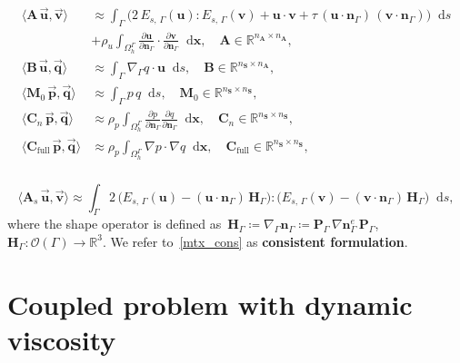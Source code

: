 \documentclass{article}
\newcommand{\vect}[1]{\boldsymbol{\mathbf{#1}}}
\newcommand*\diff{\mathop{}\!\mathrm{d}}
\begin{document}
\begin{align}\begin{split}\label{mtx}
\langle \vect A\,\vec{\vect u}, \vec{\vect v} \rangle &\approx 
\int_{\Gamma} \big( 2\,E_{s,\,\Gamma}(\vect u) : E_{s,\,\Gamma}(\vect v) + \vect u\cdot\vect v + \tau\,(\vect u\cdot\vect n_\Gamma)\,(\vect v\cdot\vect n_\Gamma) \big) \diff{s} \\
&+ 
\rho_u \int_{\Omega_h^{\Gamma}} \frac{\partial \vect u}{\partial\vect n_\Gamma}\cdot\frac{\partial \vect v}{\partial\vect n_\Gamma} \diff{\vect x}, \quad \vect A \in \mathbb R^{n_{\vect A} \times n_{\vect A}},\\
\langle \vect B\,\vec{\vect u}, \vec{\vect q} \rangle &\approx 
\int_{\Gamma} \nabla_\Gamma q \cdot \vect u \diff{s}, \quad \vect B \in \mathbb R^{n_{\vect S} \times n_{\vect A}},\\
\langle \vect M_0\,\vec{\vect p}, \vec{\vect q} \rangle &\approx
\int_{\Gamma} p\,q \diff{s}, \quad \vect M_0 \in \mathbb R^{n_{\vect S} \times n_{\vect S}},\\
\langle \vect C_n\,\vec{\vect p}, \vec{\vect q} \rangle &\approx
\rho_p \int_{\Omega^{\Gamma}_h} \frac{\partial p}{\partial\vect n_\Gamma} \frac{\partial q}{\partial\vect n_\Gamma} \diff{\vect x}, \quad \vect C_n \in \mathbb R^{n_{\vect S} \times n_{\vect S}},\\
\langle \vect C_{\text{full}}\,\vec{\vect p}, \vec{\vect q} \rangle &\approx
\rho_p \int_{\Omega^{\Gamma}_h} \nabla p \cdot \nabla q \diff{\vect x}, \quad \vect C_{\text{full}} \in \mathbb R^{n_{\vect S} \times n_{\vect S}},		 
\end{split}\end{align}\\
\begin{equation}\label{mtx_cons}
\langle \vect A_s\,\vec{\vect u}, \vec{\vect v} \rangle \approx \int_{\Gamma} 2\,\big( E_{s,\,\Gamma}(\vect u) - (\vect u\cdot\vect n_{\Gamma})\,\vect H_{\Gamma} \big) : \big( E_{s,\,\Gamma}(\vect v) - (\vect v\cdot\vect n_\Gamma)\,\vect H_{\Gamma} \big) \diff{s},
\end{equation}
where the shape operator is defined as~$\vect H_\Gamma \coloneqq \nabla_\Gamma \vect n_\Gamma \coloneqq \vect P_{\Gamma}\,\nabla \vect n^e_\Gamma\,\vect P_{\Gamma}$, $\vect H_\Gamma : \mathcal{O}(\Gamma) \rightarrow \mathbb{R}^3$. We refer to~\eqref{mtx_cons} as \textbf{consistent formulation}.


\newpage
\section{Coupled problem with dynamic viscosity}
\end{document}
